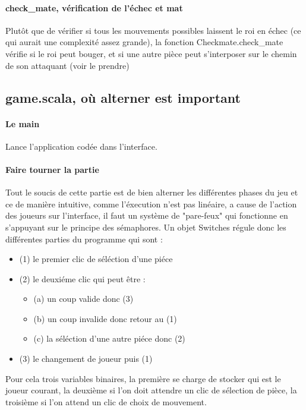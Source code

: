 \documentclass[a4paper]{article}
\begin{document}
\paragraph {check_mate, vérification de l'échec et mat} Plutôt que de vérifier si tous les mouvements possibles laissent le roi en échec (ce qui aurait une complexité assez grande), la fonction Checkmate.check_mate vérifie si le roi peut bouger, et si une autre pièce peut s'interposer sur le chemin de son attaquant (voir le prendre)


\subsection{game.scala, où alterner est important}

\paragraph{Le main} Lance l'application codée dans l'interface.

\paragraph{Faire tourner la partie} Tout le soucis de cette partie est de bien alterner les différentes phases du jeu et ce de manière intuitive, comme l'éxecution n'est pas linéaire, a cause de l'action des joueurs sur l'interface, il faut un système de "pare-feux" qui fonctionne en s'appuyant sur le principe des sémaphores. Un objet Switches régule donc les différentes parties du programme qui sont  : \\

\begin{itemize}
	\item (1) le premier clic de séléction d'une piéce
	\item (2) le deuxiéme clic qui peut être :
		\begin{itemize}
		\item	(a) un coup valide donc (3)
		\item	(b) un coup invalide donc retour au (1)
		\item   (c) la séléction d'une autre piéce donc (2)
				
		\end{itemize}
	\item (3) le changement de joueur puis (1)
\end{itemize}
\vspace{0.5 cm}

Pour cela trois variables binaires, la première se charge de stocker qui est le joueur courant, la deuxième si l'on doit attendre un clic de sélection de pièce, la troisième si l'on attend un clic de choix de mouvement.\\
\end{document}
